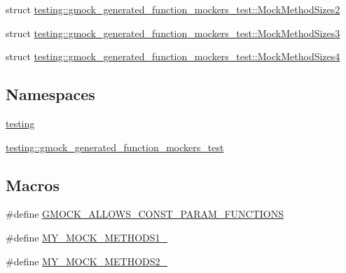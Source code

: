 \begin{DoxyCompactItemize}
\item 
struct \mbox{\hyperlink{structtesting_1_1gmock__generated__function__mockers__test_1_1MockMethodSizes2}{testing\+::gmock\+\_\+generated\+\_\+function\+\_\+mockers\+\_\+test\+::\+Mock\+Method\+Sizes2}}
\item 
struct \mbox{\hyperlink{structtesting_1_1gmock__generated__function__mockers__test_1_1MockMethodSizes3}{testing\+::gmock\+\_\+generated\+\_\+function\+\_\+mockers\+\_\+test\+::\+Mock\+Method\+Sizes3}}
\item 
struct \mbox{\hyperlink{structtesting_1_1gmock__generated__function__mockers__test_1_1MockMethodSizes4}{testing\+::gmock\+\_\+generated\+\_\+function\+\_\+mockers\+\_\+test\+::\+Mock\+Method\+Sizes4}}
\end{DoxyCompactItemize}
\subsection*{Namespaces}
\begin{DoxyCompactItemize}
\item 
 \mbox{\hyperlink{namespacetesting}{testing}}
\item 
 \mbox{\hyperlink{namespacetesting_1_1gmock__generated__function__mockers__test}{testing\+::gmock\+\_\+generated\+\_\+function\+\_\+mockers\+\_\+test}}
\end{DoxyCompactItemize}
\subsection*{Macros}
\begin{DoxyCompactItemize}
\item 
\#define \mbox{\hyperlink{gmock-generated-function-mockers__test_8cc_af5ea000ce48c75251a5542898a872339}{G\+M\+O\+C\+K\+\_\+\+A\+L\+L\+O\+W\+S\+\_\+\+C\+O\+N\+S\+T\+\_\+\+P\+A\+R\+A\+M\+\_\+\+F\+U\+N\+C\+T\+I\+O\+NS}}
\item 
\#define \mbox{\hyperlink{gmock-generated-function-mockers__test_8cc_a9ae68063487fddb9f678e66728fae155}{M\+Y\+\_\+\+M\+O\+C\+K\+\_\+\+M\+E\+T\+H\+O\+D\+S1\+\_\+}}
\item 
\#define \mbox{\hyperlink{gmock-generated-function-mockers__test_8cc_ac36252ad7584222cebc036d56465d652}{M\+Y\+\_\+\+M\+O\+C\+K\+\_\+\+M\+E\+T\+H\+O\+D\+S2\+\_\+}}
\end{DoxyCompactItemize}
